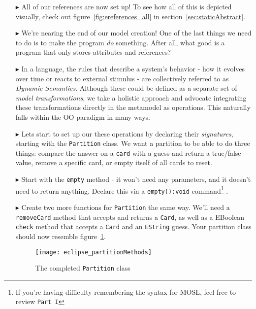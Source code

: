 \begin{itemize}
\item[$\blacktriangleright$] All of our references are now set up! To see how all of this is depicted visually, check out figure~\ref{fig:ereferences_all} in section~\ref{sec:staticAbstract}.

\pagebreak

\item[$\blacktriangleright$] We're nearing the end of our model creation! One of the last things we need to do is to make the program \emph{do} something. After all, what good is a program that only stores attributes and references?

\item[$\blacktriangleright$] In a language, the rules that describe a system's behavior - how it evolves over time or reacts to external stimulus - are collectively referred to as \emph{Dynamic Semantics}. Although these could be defined as a separate set of \emph{model transformations}, we take a holistic approach and advocate integrating these transformations directly in the metamodel as operations. This naturally falls within the OO paradigm in many ways.

\item[$\blacktriangleright$] Lets start to set up our these operations by declaring their \emph{signatures}, starting with the \texttt{Partition} class. We want a partition to be able to do three things: compare the answer on a \texttt{card} with a guess and return a true/false value, remove a specific card, or empty itself of all cards to reset. 

\item[$\blacktriangleright$] Start with the \texttt{empty} method - it won't need any parameters, and it doesn't need to return anything. Declare this via a \texttt{empty():void} command\footnote{If you're having difficulty remembering the syntax for MOSL, feel free to review \mbox{\texttt{Part I}}} .

\item[$\blacktriangleright$] Create two more functions for \texttt{Partition} the same way. We'll need a \texttt{removeCard} method that accepts and returns a \texttt{Card}, as well as a EBoolean \texttt{check} method that accepts a \texttt{Card} and an \texttt{EString} guess. Your partition class should now resemble figure~\ref{fig:partitionMethods}.

\begin{figure}[htbp]
	\centering
  \texttt{[image: eclipse\_partitionMethods]}
	\caption{The completed \texttt{Partition} class}
	\label{fig:partitionMethods}
\end{figure}


\end{itemize}
